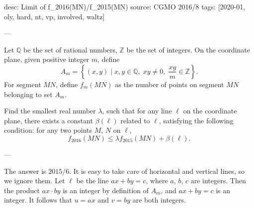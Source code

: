 desc: Limit of f_{2016}(MN)/f_{2015}(MN)
source: CGMO 2016/8
tags: [2020-01, oly, hard, nt, vp, involved, waltz]

---

Let $\mathbb Q$ be the set of rational numbers, $\mathbb Z$ be the set of integers. On the coordinate plane, given positive integer $m$, define \[A_m=\left\{(x,y)\mid x,y\in\mathbb{Q},\;xy\ne0,\;\frac{xy}{m}\in\mathbb Z\right\}.\]
For segment $MN$, define $f_m(MN)$ as the number of points on segment $MN$ belonging to set $A_m$.

Find the smallest real number $\lambda$, such that for any line $\ell$ on the coordinate plane, there exists a constant $\beta(\ell)$ related to $\ell$, satisfying the following condition: for any two points $M$, $N$ on $\ell$, \[f_{2016}(MN)\le\lambda f_{2015}(MN)+\beta(\ell).\]

---

The answer is $2015/6$. It is easy to take care of horizontal and vertical lines, so we ignore them. Let $\ell$ be the line $ax+by=c$, where $a$, $b$, $c$ are integers. Then the product $ax\cdot by$ is an integer by definition of $A_m$, and $ax+by=c$ is an integer. It follows that $u=ax$ and $v=by$ are both integers.


